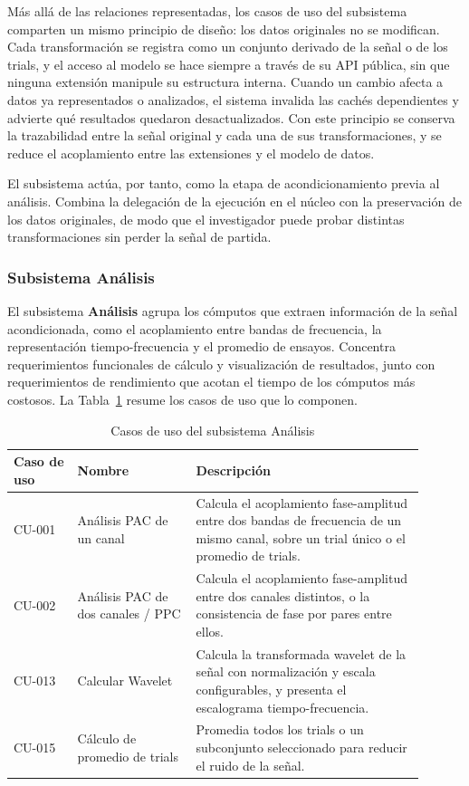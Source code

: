 \documentclass[11pt,a4paper]{article}
\DeclareRobustCommand{\_}{\textunderscore\allowbreak}
\begin{document}
M\'as all\'a de las relaciones representadas, los casos de uso del subsistema comparten un mismo principio de dise\~no: los datos originales no se modifican. Cada transformaci\'on se registra como un conjunto derivado de la se\~nal o de los trials, y el acceso al modelo se hace siempre a trav\'es de su API p\'ublica, sin que ninguna extensi\'on manipule su estructura interna. Cuando un cambio afecta a datos ya representados o analizados, el sistema invalida las cach\'es dependientes y advierte qu\'e resultados quedaron desactualizados. Con este principio se conserva la trazabilidad entre la se\~nal original y cada una de sus transformaciones, y se reduce el acoplamiento entre las extensiones y el modelo de datos.

El subsistema act\'ua, por tanto, como la etapa de acondicionamiento previa al an\'alisis. Combina la delegaci\'on de la ejecuci\'on en el n\'ucleo con la preservaci\'on de los datos originales, de modo que el investigador puede probar distintas transformaciones sin perder la se\~nal de partida.

\subsubsection{Subsistema An\'alisis}

El subsistema \textbf{An\'alisis} agrupa los c\'omputos que extraen informaci\'on de la se\~nal acondicionada, como el acoplamiento entre bandas de frecuencia, la representaci\'on tiempo-frecuencia y el promedio de ensayos. Concentra requerimientos funcionales de c\'alculo y visualizaci\'on de resultados, junto con requerimientos de rendimiento que acotan el tiempo de los c\'omputos m\'as costosos. La Tabla~\ref{tab:cu_analisis} resume los casos de uso que lo componen.

\begin{table}[H]
    \centering
    \caption{Casos de uso del subsistema An\'alisis}
    \label{tab:cu_analisis}
    \begin{tabular}{|p{0.14\linewidth}|p{0.26\linewidth}|p{0.50\linewidth}|}
        \hline
        \textbf{Caso de uso} & \textbf{Nombre} & \textbf{Descripci\'on} \\
        \hline
        CU-001 & An\'alisis PAC de un canal & Calcula el acoplamiento fase-amplitud entre dos bandas de frecuencia de un mismo canal, sobre un trial \'unico o el promedio de trials. \\
        \hline
        CU-002 & An\'alisis PAC de dos canales / PPC & Calcula el acoplamiento fase-amplitud entre dos canales distintos, o la consistencia de fase por pares entre ellos. \\
        \hline
        CU-013 & Calcular Wavelet & Calcula la transformada wavelet de la se\~nal con normalizaci\'on y escala configurables, y presenta el escalograma tiempo-frecuencia. \\
        \hline
        CU-015 & C\'alculo de promedio de trials & Promedia todos los trials o un subconjunto seleccionado para reducir el ruido de la se\~nal. \\
        \hline
    \end{tabular}
\end{table}
\end{document}
